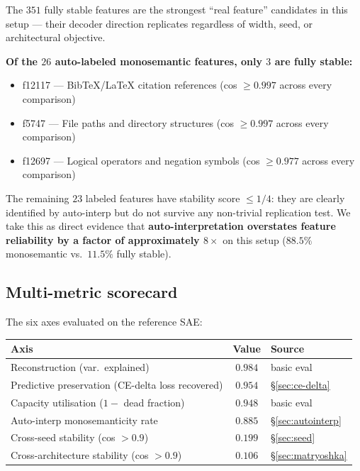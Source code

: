\documentclass[11pt]{article}
\begin{document}
The $351$ fully stable features are the strongest ``real feature''
candidates in this setup --- their decoder direction replicates regardless
of width, seed, or architectural objective.

\textbf{Of the $26$ auto-labeled monosemantic features, only $3$ are
fully stable:}
\begin{itemize}
\item f12117 --- BibTeX/LaTeX citation references (cos $\geq 0.997$
across every comparison)
\item f5747 --- File paths and directory structures (cos $\geq 0.997$
across every comparison)
\item f12697 --- Logical operators and negation symbols (cos $\geq 0.977$
across every comparison)
\end{itemize}
The remaining $23$ labeled features have stability score $\leq 1/4$:
they are clearly identified by auto-interp but do not survive any
non-trivial replication test. We take this as direct evidence that
\textbf{auto-interpretation overstates feature reliability by a factor of
approximately $8\times$} on this setup ($88.5\%$ monosemantic vs.\
$11.5\%$ fully stable).

\subsection{Multi-metric scorecard}
\label{sec:scorecard}

The six axes evaluated on the reference SAE:

\begin{center}
\begin{tabular}{lcl}
\toprule
Axis & Value & Source \\
\midrule
Reconstruction (var.\ explained) & $\mathbf{0.984}$ & basic eval \\
Predictive preservation (CE-delta loss recovered) & $\mathbf{0.954}$ & \S\ref{sec:ce-delta} \\
Capacity utilisation ($1 -$ dead fraction) & $\mathbf{0.948}$ & basic eval \\
Auto-interp monosemanticity rate & $0.885$ & \S\ref{sec:autointerp} \\
Cross-seed stability (cos $> 0.9$) & $\mathbf{0.199}$ & \S\ref{sec:seed} \\
Cross-architecture stability (cos $> 0.9$) & $\mathbf{0.106}$ & \S\ref{sec:matryoshka} \\
\bottomrule
\end{tabular}
\end{center}
\end{document}

